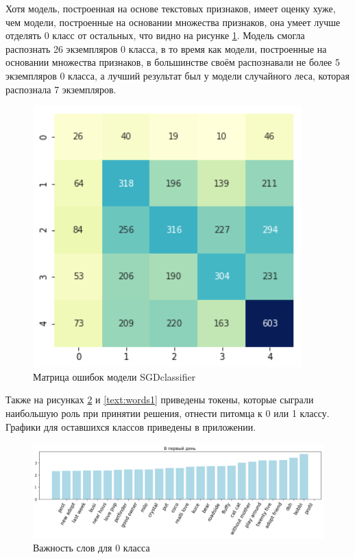 \documentclass[14pt]{mmcs_article}
\begin{document}
Хотя модель, построенная на основе текстовых признаков, имеет оценку хуже, чем модели, построенные на основании множества признаков, она умеет лучше отделять 0 класс от остальных, что видно на рисунке \ref{text:confusion}. Модель смогла распознать 26 экземпляров 0 класса, в то время как модели, построенные на основании множества признаков, в большинстве своём распознавали не более 5 экземпляров 0 класса, а лучший результат был у модели случайного леса, которая распознала 7 экземпляров.

\begin{figure}[H]
	\centering
	\includegraphics[scale=0.8]{confusionmatrix.png}
	\caption{Матрица ошибок модели SGDclassifier}\label{text:confusion}
\end{figure}

Также на рисунках \ref{text:words0} и \ref{text:words1} приведены токены, которые сыграли наибольшую роль при принятии решения, отнести питомца к 0 или 1 классу. Графики для оставшихся классов приведены в приложении.

\begin{figure}[H]
	\centering
	\includegraphics[scale=0.6]{words0.png}
	\caption{Важность слов для 0 класса}\label{text:words0}
\end{figure}
\end{document}
